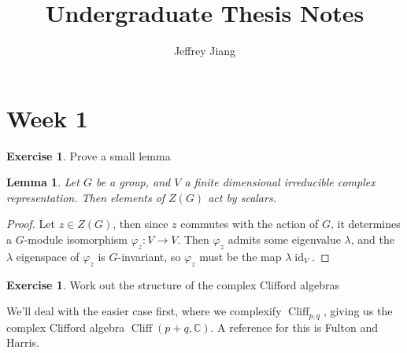 \documentclass[psamsfonts]{amsart}
\newtheorem*{lem*}{Lemma}
\theoremstyle{definition}
\newtheorem{exer}[thm]{Exercise}
\theoremstyle{remark}
\newcommand{\C}{\mathbb{C}}
\DeclareMathOperator{\id}{id}
\DeclareMathOperator{\Cliff}{Cliff}
\begin{document}
%
\author{Jeffrey Jiang}
%
\title{Undergraduate Thesis Notes}
%
\maketitle
%
\setcounter{section}{1}
%
\section*{Week 1}
%
\begin{exer}
Prove a small lemma
\begin{lem*}
Let $G$ be a group, and $V$ a finite dimensional irreducible complex representation. Then elements of $Z(G)$ act by scalars.
\end{lem*}
\end{exer}
\begin{proof}
Let $z \in Z(G)$, then since $z$ commutes with the action of $G$, it determines a $G$-module isomorphism $\varphi_z : V \to V$. Then $\varphi_z$ admits some eigenvalue $\lambda$, and the $\lambda$ eigenspace of $\varphi_z$ is $G$-invariant, so $\varphi_z$ must be the map $\lambda \id_V$.
\end{proof}
%
\begin{exer}
Work out the structure of the complex Clifford algebras
\end{exer}
We'll deal with the easier case first, where we complexify $\Cliff_{p,q}$, giving us the complex Clifford algebra $\Cliff(p+q,\C)$. A reference for this is Fulton and Harris. \\
\end{document}
